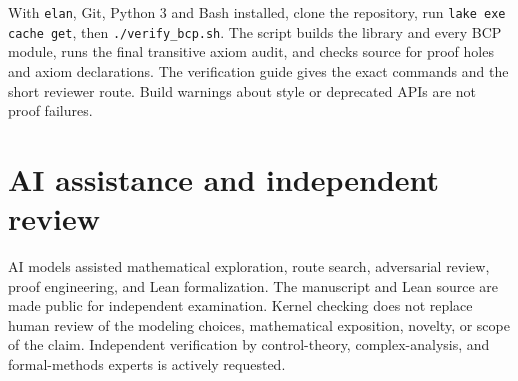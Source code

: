 \documentclass[11pt,a4paper]{article}
\theoremstyle{definition}\newtheorem{definition}[theorem]{Definition}
\theoremstyle{remark}\newtheorem{remark}[theorem]{Remark}
\begin{document}
With \texttt{elan}, Git, Python 3 and Bash installed, clone the repository,
run \texttt{lake exe cache get}, then \texttt{./verify\_bcp.sh}.
The script builds the library and every BCP module, runs the final transitive
axiom audit, and checks source for proof holes and axiom declarations.
The verification guide gives the exact commands and the short reviewer
route. Build warnings about style or deprecated APIs are not proof failures.

\section{AI assistance and independent review}
AI models assisted mathematical exploration, route search, adversarial
review, proof engineering, and Lean formalization. The manuscript and Lean
source are made public for independent examination. Kernel checking does
not replace human review of the modeling choices, mathematical exposition,
novelty, or scope of the claim. Independent verification by control-theory,
complex-analysis, and formal-methods experts is actively requested.
\end{document}
